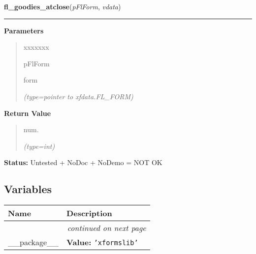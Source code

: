     \vspace{0.5ex}

\hspace{.8\funcindent}\begin{boxedminipage}{\funcwidth}

    \raggedright \textbf{fl\_goodies\_atclose}(\textit{pFlForm}, \textit{vdata})

    \vspace{-1.5ex}

    \rule{\textwidth}{0.5\fboxrule}
\setlength{\parskip}{2ex}
\setlength{\parskip}{1ex}
      \textbf{Parameters}
      \vspace{-1ex}

      \begin{quote}
        \begin{Ventry}{xxxxxxx}

          \item[pFlForm]

          form

            {\it (type=pointer to xfdata.FL\_FORM)}

        \end{Ventry}

      \end{quote}

      \textbf{Return Value}
    \vspace{-1ex}

      \begin{quote}
      num.

      {\it (type=int)}

      \end{quote}

\textbf{Status:} Untested + NoDoc + NoDemo = NOT OK



    \end{boxedminipage}



  \subsection{Variables}

    \vspace{-1cm}
\hspace{\varindent}\begin{longtable}{|p{\varnamewidth}|p{\vardescrwidth}|l}
\cline{1-2}
\cline{1-2} \centering \textbf{Name} & \centering \textbf{Description}& \\
\cline{1-2}
\endhead\cline{1-2}\multicolumn{3}{r}{\small\textit{continued on next page}}\\\endfoot\cline{1-2}
\endlastfoot\raggedright \_\-\_\-p\-a\-c\-k\-a\-g\-e\-\_\-\_\- & \raggedright \textbf{Value:} 
{\tt \texttt{'}\texttt{xformslib}\texttt{'}}&\\
\cline{1-2}
\end{longtable}


